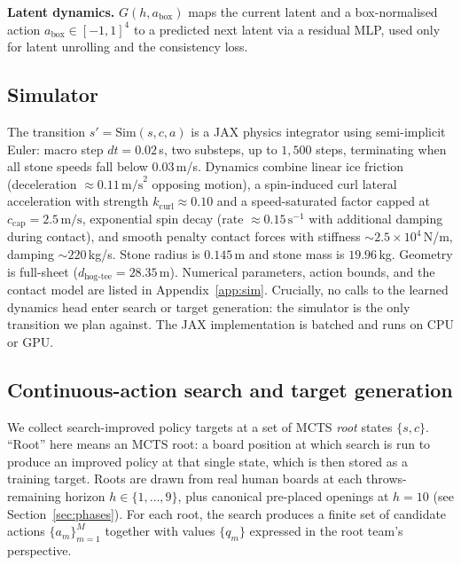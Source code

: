 \documentclass[11pt]{article}
\begin{document}
\textbf{Latent dynamics.} $G(h,a_{\text{box}})$ maps the current latent and
a box-normalised action $a_{\text{box}}\in[-1,1]^4$ to a predicted next
latent via a residual MLP, used only for latent unrolling and the
consistency loss.


\subsection{Simulator}
\label{sec:sim}
The transition $s'=\mathrm{Sim}(s,c,a)$ is a JAX physics integrator using
semi-implicit Euler: macro step $dt=0.02$\,s, two substeps, up to
$1{,}500$ steps, terminating when all stone speeds fall below $0.03$\,m/s.
Dynamics combine linear ice friction (deceleration $\approx
0.11\,\text{m/s}^2$ opposing motion), a spin-induced curl lateral
acceleration with strength $k_{\text{curl}}\approx 0.10$ and a
speed-saturated factor capped at $c_{\text{cap}}=2.5\,\text{m/s}$,
exponential spin decay (rate $\approx 0.15\,\text{s}^{-1}$ with additional
damping during contact), and smooth penalty contact forces with stiffness
$\sim 2.5\times10^4$\,N/m, damping $\sim 220$\,kg/s. Stone radius is
$0.145$\,m and stone mass is $19.96$\,kg. Geometry is full-sheet
($d_{\text{hog-tee}}=28.35$\,m). Numerical parameters, action bounds, and
the contact model are listed in Appendix~\ref{app:sim}. Crucially, no calls
to the learned dynamics head enter search or target generation: the
simulator is the only transition we plan against. The JAX implementation is
batched and runs on CPU or GPU.

\subsection{Continuous-action search and target generation}
\label{sec:search}
We collect search-improved policy targets at a set of MCTS \emph{root}
states $\{s,c\}$. ``Root'' here means an MCTS root: a board position at which
search is run to produce an improved policy at that single state, which is
then stored as a training target. Roots are drawn from real human boards at
each throws-remaining horizon $h\in\{1,\ldots,9\}$, plus canonical pre-placed
openings at $h=10$ (see Section~\ref{sec:phases}). For each root, the search
produces a finite set of candidate actions $\{a_m\}_{m=1}^{M}$ together with
values $\{q_m\}$ expressed in the root team's perspective.
\end{document}
